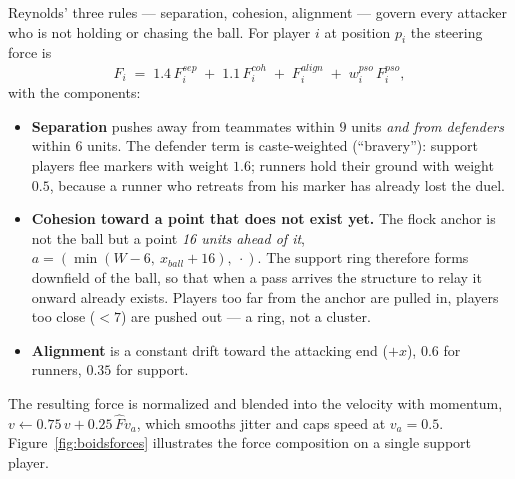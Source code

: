\documentclass[11pt,a4paper]{article}
\begin{document}
Reynolds' three rules --- separation, cohesion, alignment --- govern every attacker who is not
holding or chasing the ball. For player $i$ at position $p_i$ the steering force is
\begin{equation}\label{eq:boids}
  F_i \;=\; 1.4\,F^{sep}_i \;+\; 1.1\,F^{coh}_i \;+\; F^{align}_i \;+\; w^{pso}_i\,F^{pso}_i ,
\end{equation}
with the components:

\begin{itemize}[itemsep=2pt]
  \item \textbf{Separation} pushes away from teammates within $9$ units \emph{and from
        defenders} within $6$ units. The defender term is caste-weighted (``bravery''): support
        players flee markers with weight $1.6$; runners hold their ground with weight $0.5$,
        because a runner who retreats from his marker has already lost the duel.
  \item \textbf{Cohesion toward a point that does not exist yet.} The flock anchor is not the
        ball but a point \emph{16 units ahead of it}, $a = (\min(W-6,\ x_{ball}+16),\ \cdot)$.
        The support ring therefore forms downfield of the ball, so that when a pass arrives
        the structure to relay it onward already exists. Players too far from the anchor are
        pulled in, players too close ($<7$) are pushed out --- a ring, not a cluster.
  \item \textbf{Alignment} is a constant drift toward the attacking end ($+x$), $0.6$ for
        runners, $0.35$ for support.
\end{itemize}

The resulting force is normalized and blended into the velocity with momentum,
$v \leftarrow 0.75\,v + 0.25\,\hat{F} v_a$, which smooths jitter and caps speed at $v_a=0.5$.
Figure~\ref{fig:boidsforces} illustrates the force composition on a single support player.
\end{document}
